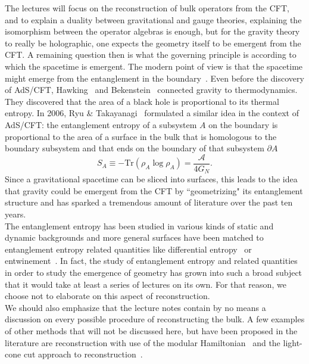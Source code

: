 \documentclass{PoS}
\newcommand{\Am}{\ensuremath{\mathcal{A}}}
\newcommand{\LF}{\left(}
\newcommand{\RF}{\right)}
\begin{document}
The lectures will focus on the reconstruction of bulk operators from the CFT, and to explain a duality between gravitational and gauge theories, explaining the isomorphism between the operator algebras is enough, but for the gravity theory to really be holographic, one expects the geometry itself to be emergent from the CFT. A remaining question then is what the governing principle is according to which the spacetime is emergent. The modern point of view is that the spacetime might emerge from the entanglement in the boundary~\cite{Ryu:2006bv,VanRaamsdonk:2009ar}. Even before the discovery of AdS/CFT, Hawking~\cite{Hawking:1974sw} and Bekenstein~\cite{Bekenstein:1973ur} connected gravity to thermodynamics. They discovered that the area of a black hole is proportional to its thermal entropy. In 2006, Ryu \& Takayanagi~\cite{Ryu:2006bv} formulated a similar idea in the context of AdS/CFT: the entanglement entropy of a subsystem $A$ on the boundary is proportional to the area of a surface in the bulk that is homologous to the boundary subsystem and that ends on the boundary of that subsystem $\partial A$
\begin{equation}
S_A \equiv - \text{Tr} \LF \rho_A\log\rho_A\RF=\frac{\Am}{4G_N}.
\end{equation} 
Since a gravitational spacetime can be sliced into surfaces, this leads to the idea that gravity could be emergent from the CFT by ``geometrizing" its entanglement structure and has sparked a tremendous amount of literature over the past ten years.\\

The entanglement entropy has been studied in various kinds of static and dynamic backgrounds and more general surfaces have been matched to entanglement entropy related quantities like differential entropy~\cite{Balasubramanian:2013lsa,Headrick:2014eia} or entwinement~\cite{Balasubramanian:2014sra,Balasubramanian:2016xho}. In fact, the study of entanglement entropy and related quantities in order to study the emergence of geometry has grown into such a broad subject that it would take at least a series of lectures on its own. For that reason, we choose not to elaborate on this aspect of reconstruction.\\

We should also emphasize that the lecture notes contain by no means a discussion on every possible procedure of reconstructing the bulk. A few examples of other methods that will not be discussed here, but have been proposed in the literature are reconstruction with use of the modular Hamiltonian~\cite{Faulkner:2017vdd} and the light-cone cut approach to reconstruction~\cite{Engelhardt:2016wgb}.\\
\end{document}
